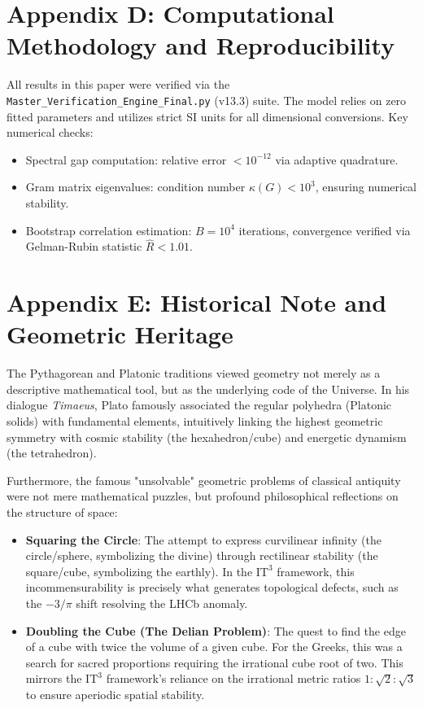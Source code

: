 \documentclass[12pt,a4paper,oneside]{article}
\theoremstyle{plain}
\theoremstyle{definition}
\theoremstyle{remark}
\newcommand{\ITthree}{\mathrm{IT}^3}
\begin{document}
\section*{Appendix D: Computational Methodology and Reproducibility}
All results in this paper were verified via the \texttt{Master\_Verification\_Engine\_Final.py} (v13.3) suite. The model relies on zero fitted parameters and utilizes strict SI units for all dimensional conversions. Key numerical checks:
\begin{itemize}
    \item Spectral gap computation: relative error $< 10^{-12}$ via adaptive quadrature.
    \item Gram matrix eigenvalues: condition number $\kappa(G) < 10^3$, ensuring numerical stability.
    \item Bootstrap correlation estimation: $B=10^4$ iterations, convergence verified via Gelman-Rubin statistic $\hat{R} < 1.01$.
\end{itemize}

\section*{Appendix E: Historical Note and Geometric Heritage}
The Pythagorean and Platonic traditions viewed geometry not merely as a descriptive mathematical tool, but as the underlying code of the Universe. In his dialogue \textit{Timaeus}, Plato famously associated the regular polyhedra (Platonic solids) with fundamental elements, intuitively linking the highest geometric symmetry with cosmic stability (the hexahedron/cube) and energetic dynamism (the tetrahedron).

Furthermore, the famous "unsolvable" geometric problems of classical antiquity were not mere mathematical puzzles, but profound philosophical reflections on the structure of space:
\begin{itemize}
    \item \textbf{Squaring the Circle}: The attempt to express curvilinear infinity (the circle/sphere, symbolizing the divine) through rectilinear stability (the square/cube, symbolizing the earthly). In the $\ITthree$ framework, this incommensurability is precisely what generates topological defects, such as the $-3/\pi$ shift resolving the LHCb anomaly.
    \item \textbf{Doubling the Cube (The Delian Problem)}: The quest to find the edge of a cube with twice the volume of a given cube. For the Greeks, this was a search for sacred proportions requiring the irrational cube root of two. This mirrors the $\ITthree$ framework's reliance on the irrational metric ratios $1:\sqrt{2}:\sqrt{3}$ to ensure aperiodic spatial stability.
\end{itemize}
\end{document}
